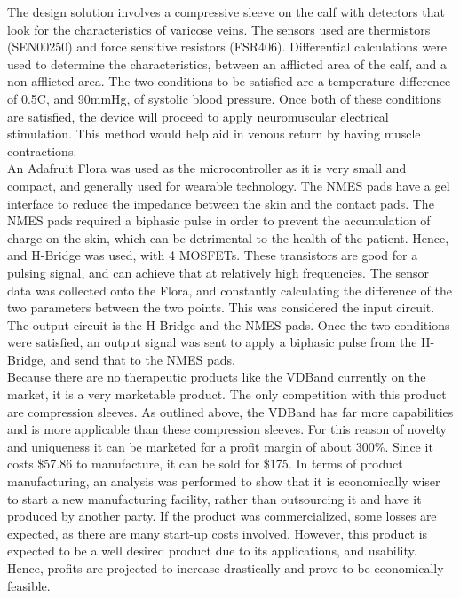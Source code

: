 \documentclass[11.5pt]{article}
\begin{document}
The design solution involves a compressive sleeve on the calf with detectors that look for the characteristics of varicose veins. The sensors used are thermistors (SEN00250) and force sensitive resistors (FSR406). Differential calculations were used to determine the characteristics, between an afflicted area of the calf, and a non-afflicted area. The two conditions to be satisfied are a temperature difference of 0.5\degree C, and 90mmHg, of systolic blood pressure. Once both of these conditions are satisfied, the device will proceed to apply neuromuscular electrical stimulation. This method would help aid in venous return by having muscle contractions. \\

An Adafruit Flora was used as the microcontroller as it is very small and compact, and generally used for wearable technology. The NMES pads have a gel interface to reduce the impedance between the skin and the contact pads. The NMES pads required a biphasic pulse in order to prevent the accumulation of charge on the skin, which can be detrimental to the health of the patient. Hence, and H-Bridge was used, with 4 MOSFETs. These transistors are good for a pulsing signal, and can achieve that at relatively high frequencies. The sensor data was collected onto the Flora, and constantly calculating the difference of the two parameters between the two points. This was considered the input circuit. The output circuit is the H-Bridge and the NMES pads. Once the two conditions were satisfied, an output signal was sent to apply a biphasic pulse from the H-Bridge, and send that to the NMES pads. \\

Because there are no therapeutic products like the VDBand currently on the market, it is a very marketable product. The only competition with this product are compression sleeves. As outlined above, the VDBand has far more capabilities and is more applicable than these compression sleeves. For this reason of novelty and uniqueness it can be marketed for a profit margin of about 300\%. Since it costs \$57.86 to manufacture, it can be sold for \$175. In terms of product manufacturing, an analysis was performed to show that it is economically wiser to start a new manufacturing facility, rather than outsourcing it and have it produced by another party. If the product was commercialized, some losses are expected, as there are many start-up costs involved. However, this product is expected to be a well desired product due to its applications, and usability. Hence, profits are projected to increase drastically and prove to be economically feasible. \\
\end{document}
